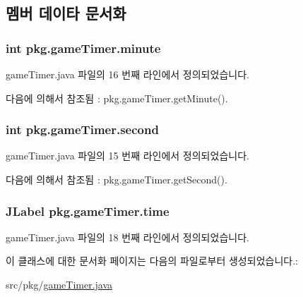 \subsection{멤버 데이타 문서화}
\subsubsection[{\texorpdfstring{minute}{minute}}]{\setlength{\rightskip}{0pt plus 5cm}int pkg.\+game\+Timer.\+minute\hspace{0.3cm}{\ttfamily [private]}}\hypertarget{classpkg_1_1game_timer_ad7da9d653901d69078509ea47694bcfa}{}\label{classpkg_1_1game_timer_ad7da9d653901d69078509ea47694bcfa}


game\+Timer.\+java 파일의 16 번째 라인에서 정의되었습니다.



다음에 의해서 참조됨 \+:  pkg.\+game\+Timer.\+get\+Minute().

\subsubsection[{\texorpdfstring{second}{second}}]{\setlength{\rightskip}{0pt plus 5cm}int pkg.\+game\+Timer.\+second\hspace{0.3cm}{\ttfamily [private]}}\hypertarget{classpkg_1_1game_timer_a06c42bbe6c9cacd4b94a0dcae1564208}{}\label{classpkg_1_1game_timer_a06c42bbe6c9cacd4b94a0dcae1564208}


game\+Timer.\+java 파일의 15 번째 라인에서 정의되었습니다.



다음에 의해서 참조됨 \+:  pkg.\+game\+Timer.\+get\+Second().

\subsubsection[{\texorpdfstring{time}{time}}]{\setlength{\rightskip}{0pt plus 5cm}J\+Label pkg.\+game\+Timer.\+time\hspace{0.3cm}{\ttfamily [private]}}\hypertarget{classpkg_1_1game_timer_adc15a552f72e3252db98b1589e04b614}{}\label{classpkg_1_1game_timer_adc15a552f72e3252db98b1589e04b614}


game\+Timer.\+java 파일의 18 번째 라인에서 정의되었습니다.



이 클래스에 대한 문서화 페이지는 다음의 파일로부터 생성되었습니다.\+:\begin{DoxyCompactItemize}
\item 
src/pkg/\hyperlink{game_timer_8java}{game\+Timer.\+java}\end{DoxyCompactItemize}
